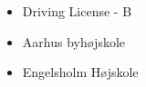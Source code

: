 






\begin{itemize}
\item Driving License - B 
\item Aarhus byhøjskole
\item Engelsholm Højskole
\end{itemize}








